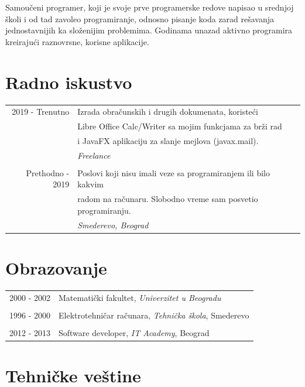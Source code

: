 \documentclass[a4paper,11pt]{article}
\begin{document}
{Samoučeni programer, koji je svoje prve programerske redove napisao u srednjoj školi i od tad zavoleo programiranje, odnosno pisanje koda zarad rešavanja jednostavnijih ka složenijim problemima. Godinama unazad aktivno programira kreirajući raznovrsne, korisne aplikacije.
  
  \section*{Radno iskustvo}
  
  \begin{tabular}{r|l}
    2019 - Trenutno  & Izrada obračunskih i drugih dokumenata, koristeći\\ 
                     & Libre Office Calc/Writer sa mojim funkcjama za brži rad\\
                     & i JavaFX aplikaciju za slanje mejlova (javax.mail).\\
                     & \emph{Freelance}\\
    \multicolumn{2}{c}{} \\
    Prethodno - 2019 & Poslovi koji nisu imali veze sa programiranjem ili bilo kakvim\\
                     & radom na računaru. Slobodno vreme sam posvetio programiranju.\\
                     & \emph{Smederevo, Beograd}\\
  \end{tabular}
  
  \section*{Obrazovanje}
  
  \begin{tabular}{r|l}
    2000 - 2002 & Matematički fakultet, \emph{Univerzitet u Beogradu}\\
    \multicolumn{2}{c}{} \\
    1996 - 2000 & Elektrotehničar računara, \emph{Tehnička škola}, Smederevo\\
    \multicolumn{2}{c}{} \\
    2012 - 2013 & Software developer, \emph{IT Academy}, Beograd\\ 
  \end{tabular}
  
  \section*{Tehničke veštine}
  
}
\end{document}
